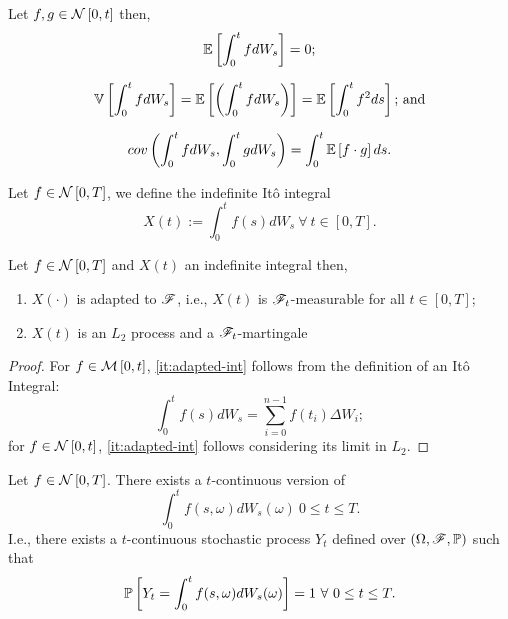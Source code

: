 \documentclass[../TGMAFFIRO.tex]{subfiles}
\begin{document}
\begin{proposition}
	Let $f, g \in \mathcal{N}\left[0, t\right]$ then,
	\begin{equation}
		\mathbb{E}\left[\int_0^t f dW_s\right] = 0;
	\end{equation}
	
	\begin{equation}
		\mathbb{V}\left[\int_0^t f dW_s\right] = \mathbb{E}\left[\left(\int_0^t f dW_s\right)\right] = \mathbb{E}\left[\int_0^t f^2 ds\right]\text{; and}
	\end{equation}
	
	\begin{equation}
		cov\left(\int_0^tfdW_s, \int_0^tgdW_s\right) = \int_0^t \mathbb{E}\left[f\cdot g\right] ds.
	\end{equation}
\end{proposition}

\begin{definition}
	Let $f\in \mathcal{N}\left[0, T\right]$, we define the indefinite It\^o integral
	\begin{equation}
		X(t) := \int_0^t f(s) dW_s \ \forall \ t\in[0, T].
	\end{equation}
\end{definition}

\begin{proposition}
	Let $f\in\mathcal{N}\left[0, T\right]$ and $X(t)$ an indefinite integral then,
	\begin{enumerate}
		\item $X(\cdot)$ is adapted to $\mathscr{F}$, i.e., $X(t)$ is $\mathscr{F}_t$-measurable for all $t\in[0, T]$; \label{it:adapted-int}
		\item $X(t)$ is an $L_2$ process and a $\mathscr{F}_t$-martingale
	\end{enumerate}
\end{proposition}

\begin{proof}
For $f\in\mathcal{M}\left[0, t\right]$, \ref{it:adapted-int} follows from the definition of an It\^o Integral:
\begin{equation}
  \int_0^t f(s) dW_s = \sum_{i=0}^{n-1} f(t_i) \Delta W_i;
\end{equation}
for $f\in\mathcal{N}\left[0, t\right]$, \ref{it:adapted-int} follows considering its limit in $L_2$.
\end{proof}


\begin{theorem}
	Let $f\in\mathcal{N}\left[0, T\right]$. There exists a $t$-continuous version of
	\begin{equation}
		\int_0^t f(s,\omega) dW_s(\omega) \ 0\leq t \leq T.
	\end{equation}
I.e., there exists a $t$-continuous stochastic process $Y_t$ defined over $(\Omega, \mathscr{F}, \mathbb{P})$ such that
\begin{equation}
	\mathbb{P}\left[Y_t = \int_0^tf(s,\omega) dW_s(\omega)\right] = 1 \ \forall \ 0\leq t \leq T.
\end{equation}
\end{theorem}
\end{document}
